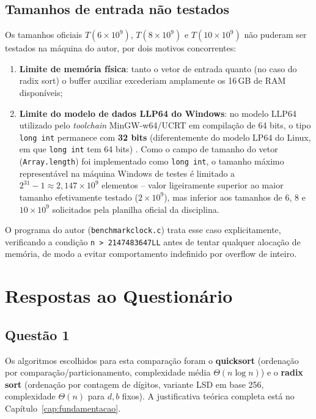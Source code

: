 \documentclass[
	12pt,
	oneside,
	a4paper,
	chapter=TITLE,
	section=TITLE,
	subsection=TITLE,
	subsubsection=TITLE,
	english,
	brazil
]{abntex2}
\theoremstyle{plain}
\theoremstyle{remark}
\renewcommand{\_}{\underscoreoriginal\allowbreak}
\begin{document}
\section{Tamanhos de entrada não testados}

Os tamanhos oficiais $T(6\times10^{9})$, $T(8\times10^{9})$ e $T(10\times10^{9})$ não puderam ser testados na máquina do autor, por dois motivos concorrentes:

\begin{enumerate}
	\item \textbf{Limite de memória física}: tanto o vetor de entrada quanto (no caso do radix sort) o buffer auxiliar excederiam amplamente os 16\,GB de RAM disponíveis;
	\item \textbf{Limite do modelo de dados LLP64 do Windows}: no modelo LLP64 utilizado pelo \emph{toolchain} MinGW-w64/UCRT em compilação de 64 bits, o tipo \texttt{long int} permanece com \textbf{32 bits} (diferentemente do modelo LP64 do Linux, em que \texttt{long int} tem 64 bits) \cite{microsoft_llp64}. Como o campo de tamanho do vetor (\texttt{Array.length}) foi implementado como \texttt{long int}, o tamanho máximo representável na máquina Windows de testes é limitado a $2^{31}-1 \approx 2{,}147\times10^{9}$ elementos -- valor ligeiramente superior ao maior tamanho efetivamente testado ($2\times10^{9}$), mas inferior aos tamanhos de $6$, $8$ e $10\times10^{9}$ solicitados pela planilha oficial da disciplina.
\end{enumerate}

O programa do autor (\texttt{benchmark\_clock.c}) trata esse caso explicitamente, verificando a condição \texttt{n > 2147483647LL} antes de tentar qualquer alocação de memória, de modo a evitar comportamento indefinido por overflow de inteiro.

\chapter{Respostas ao Questionário}
\label{cap:questionario}

\section{Questão 1}
Os algoritmos escolhidos para esta comparação foram o \textbf{quicksort} (ordenação por comparação/particionamento, complexidade média $\Theta(n \log n)$) e o \textbf{radix sort} (ordenação por contagem de dígitos, variante LSD em base 256, complexidade $\Theta(n)$ para $d,b$ fixos). A justificativa teórica completa está no Capítulo~\ref{cap:fundamentacao}.
\end{document}
